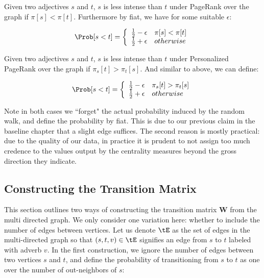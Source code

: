 \theoremstyle{definition}
\begin{definition}
Given two adjectives $s$ and $t$, $s$ is less intense than $t$ under PageRank over the graph if $\pi[s] < \pi[t]$. Furthermore by fiat, we have for some suitable $\epsilon$:

\[   
\Prob[s < t] = \left\{
\begin{array}{ll}
      \frac{1}{2} - \epsilon & \pi[s] < \pi[t] \\
      \frac{1}{2} + \epsilon & otherwise
\end{array} 
\right. 
\]
\end{definition}

\theoremstyle{definition}
\begin{definition}
Given two adjectives $s$ and $t$, $s$ is less intense than $t$ under Personalized PageRank over the graph if $\pi_s[t] > \pi_t[s]$. And similar to above, we can define:

\[   
\Prob[s < t] = \left\{
\begin{array}{ll}
      \frac{1}{2} - \epsilon & \pi_s[t] > \pi_t[s] \\
      \frac{1}{2} + \epsilon & otherwise
\end{array} 
\right. 
\]
\end{definition}

Note in both cases we ``forget" the actual probability induced by the random walk, and define the probability by fiat. This is due to our previous claim in the baseline chapter that a slight edge suffices. The second reason is mostly practical: due to the quality of our data, in practice it is prudent to not assign too much credence to the values output by the centrality measures beyond the gross direction they indicate. 

\subsection{Constructing the Transition Matrix}

This section outlines two ways of constructing the transition matrix $\pmb{W}$ from the multi directed graph. We only consider one variation here: whether to include the number of edges between vertices. Let us denote $\tE$ as the set of edges in the multi-directed graph so that $(s,t,v) \in \tE$ signifies an edge from $s$ to $t$ labeled with adverb $v$. In the first construction, we ignore the number of edges between two vertices $s$ and $t$, and define the probability of transitioning from $s$ to $t$ as one over the number of out-neighbors of $s$:

